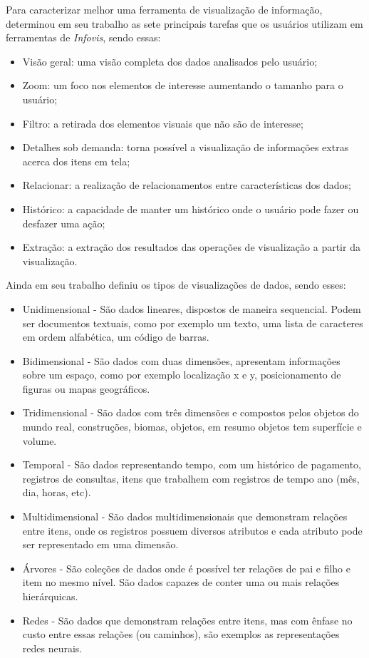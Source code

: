 \documentclass[
	12pt,				%
	openright,			%
	oneside,			%
	a4paper,			%
	english,			%
	brazil				%
	]{abntex2}
\begin{document}
Para caracterizar melhor uma ferramenta de visualização de informação, \cite{Shneiderman1996} determinou em seu trabalho as sete principais tarefas que os usuários utilizam em ferramentas de \textit{Infovis}, sendo essas:
\begin{itemize}
    \item  Visão geral: uma visão completa dos dados analisados pelo usuário;
    \item  Zoom: um foco nos elementos de interesse aumentando o tamanho para o usuário;
    \item  Filtro: a retirada dos elementos visuais que não são de interesse;
    \item  Detalhes sob demanda: torna possível a visualização de informações extras acerca dos itens em tela;
    \item  Relacionar: a realização de relacionamentos entre 
    características dos dados;
    \item  Histórico: a capacidade de manter um histórico onde o usuário pode fazer ou desfazer uma ação;
    \item  Extração: a extração dos resultados das operações de visualização a partir da visualização.
\end{itemize}
 
 Ainda em seu trabalho \cite{Shneiderman1996} definiu os tipos de visualizações de dados, sendo esses:
\begin{itemize}
    \item Unidimensional - São dados lineares, dispostos de maneira sequencial. Podem ser documentos textuais, como por exemplo um texto, uma lista de caracteres em ordem alfabética, um código de barras.
    \item Bidimensional - São dados com duas dimensões, apresentam informações sobre um espaço, como por exemplo localização x e y, posicionamento de figuras ou mapas geográficos.
    \item Tridimensional - São dados com três dimensões e compostos pelos objetos do mundo real, construções, biomas, objetos, em resumo objetos tem superfície e volume.
    \item Temporal - São dados representando tempo, com um histórico de pagamento, registros de consultas, itens que trabalhem com registros de tempo ano (mês, dia, horas, etc).
    \item Multidimensional - São dados multidimensionais que demonstram relações entre itens, onde os registros possuem diversos atributos e cada atributo pode ser representado em uma dimensão.
    \item Árvores - São coleções de dados onde é possível ter relações de pai e filho e item no mesmo nível. São dados capazes de conter uma ou mais relações hierárquicas.
    \item Redes - São dados que demonstram relações entre itens, mas com ênfase no custo entre essas relações (ou caminhos), são exemplos as representações redes neurais.
\end{itemize}
\end{document}
